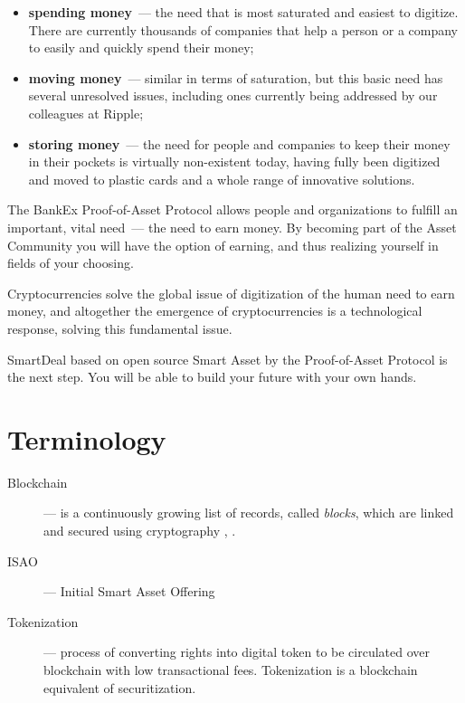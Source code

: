 \documentclass{article}
\begin{document}
\begin{multicols}{2}
\begin{itemize}
\item \textbf{spending money}~--- the need that is most saturated and easiest to digitize. There are currently thousands of companies that help a person or a company to easily and quickly spend their money;
\item \textbf{moving money}~--- similar in terms of saturation, but this basic need has several unresolved issues, including ones currently being addressed by our colleagues at Ripple;
\item \textbf{storing money}~--- the need for people and companies to keep their money in their pockets is virtually non-existent today, having fully been digitized and moved to plastic cards and a whole range of innovative solutions. 
\end{itemize}

The BankEx Proof-of-Asset Protocol allows people and organizations to fulfill an important, vital need~--- the need to earn money. By becoming part of the Asset Community you will have the option of earning, and thus realizing yourself in fields of your choosing. 

Cryptocurrencies solve the global issue of digitization of the human need to earn money, and altogether the emergence of cryptocurrencies is a technological response, solving this fundamental issue. 

SmartDeal based on open source Smart Asset by the Proof-of-Asset Protocol is the next step. You will be able to build your future with your own hands.

\end{multicols}

\newpage
\appendix

\section{Terminology}
\begin{description}
\item[Blockchain]--- is a continuously growing list of records, called \textit{blocks}, which are linked and secured using cryptography \cite{bitcoinComprehensive2016}, \cite{wikipediaBlockchain}.
\item[ISAO]--- Initial Smart Asset Offering
\item[Tokenization]--- process of converting rights into digital token to be circulated over blockchain with low transactional fees. Tokenization is a blockchain equivalent of securitization.
\end{description}
\end{document}
